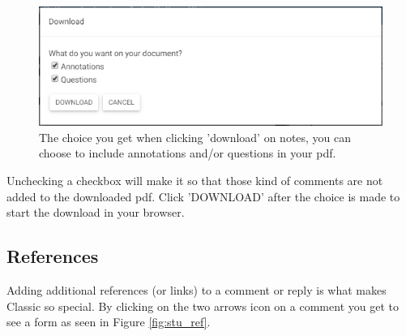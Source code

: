 \documentclass[a4paper,11pt]{report}
\begin{document}
\begin{figure}[H]
\centering
\includegraphics[scale=0.55]{imgs/stu_download.png}
\caption{The choice you get when clicking 'download' on notes, you can choose to include annotations and/or questions in your pdf.}
\label{fig:stu_download}
\end{figure}
Unchecking a checkbox will make it so that those kind of comments are not added to the downloaded pdf. Click 'DOWNLOAD' after the choice is made to start the download in your browser.


\subsection{References}
\label{stu:ref}
Adding additional references (or links) to a comment or reply is what makes Classic so special. By clicking on the two arrows icon on a comment you get to see a form as seen in Figure \ref{fig:stu_ref}.
\end{document}
